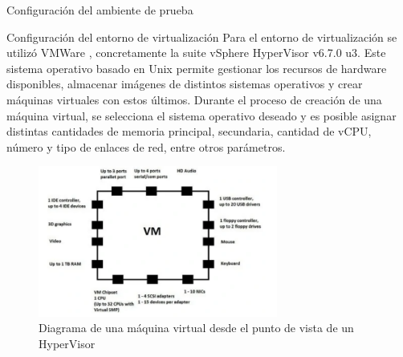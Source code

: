 \begin{section}{Configuración del ambiente de prueba}
        \begin{subsection}{Configuración del entorno de virtualización}
        Para el entorno de virtualización se utilizó VMWare \cite{vmware}, concretamente la suite vSphere HyperVisor v6.7.0 u3. Este sistema operativo basado en Unix permite gestionar los recursos de hardware disponibles, almacenar imágenes de distintos sistemas operativos y crear máquinas virtuales con estos últimos. Durante el proceso de creación de una máquina virtual, se selecciona el sistema operativo deseado y es posible asignar distintas cantidades de memoria principal, secundaria, cantidad de vCPU, número y tipo de enlaces de red, entre otros parámetros. \par
         \begin{figure}[H]
          \centering
           \includegraphics[width=0.7\textwidth]{./iteracion_2_imagenes/figura_34_diagrama_VM.png}
            \caption{ Diagrama de una máquina virtual desde el punto de vista de un HyperVisor\cite{vmware}}
            \label{fig:maquina_virtual}
        \end{figure}
        \end{subsection}
        

\end{section}
